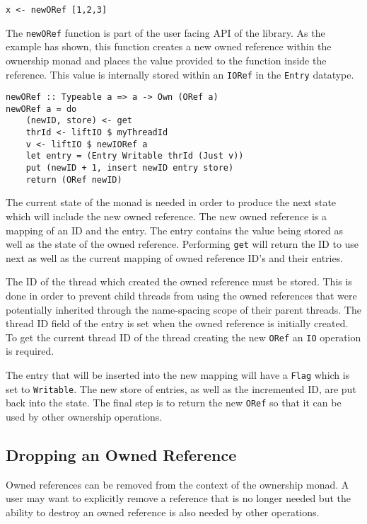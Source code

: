 \documentclass[onehalf,11pt]{beavtex}
\begin{document}
\begin{verbatim}
x <- newORef [1,2,3]
\end{verbatim}

The \texttt{newORef} function is part of the user facing API of the library.
As the example has shown, this function creates a new owned reference
within the ownership monad and places the value provided to the function
inside the reference. This value is internally stored within an \texttt{IORef}
in the \texttt{Entry} datatype.

\begin{verbatim}
newORef :: Typeable a => a -> Own (ORef a)
newORef a = do
    (newID, store) <- get
    thrId <- liftIO $ myThreadId
    v <- liftIO $ newIORef a
    let entry = (Entry Writable thrId (Just v))
    put (newID + 1, insert newID entry store)
    return (ORef newID)
\end{verbatim}

The current state of the monad is needed in order to produce the next state
which will include the new owned reference.
The new owned reference is a mapping of an ID and the entry. The entry
contains the value being stored as well as the state of the owned reference.
Performing \texttt{get} will return the ID to use next as well as the current
mapping of owned reference ID's and their entries.

The ID of the thread which created the owned reference must be stored.
This is done in order to prevent child threads from using the owned
references that were potentially inherited through the name-spacing scope of
their parent threads.  The thread ID field of the entry is set when the owned
reference is initially created.
To get the current thread ID of the thread creating the new \texttt{ORef}
an \texttt{IO} operation is required.

The entry that will be inserted into the new mapping will have a \texttt{Flag}
which is set to \texttt{Writable}.
The new store of entries, as well as the incremented ID, are put back into the
state.
The final step is to return the new \texttt{ORef} so that it can be used by other
ownership operations.

\subsection{Dropping an Owned Reference}

Owned references can be removed from the context of the ownership monad.
A user may want to explicitly remove a reference that is no longer needed but
the ability to destroy an owned reference is also needed by other operations.
\end{document}
